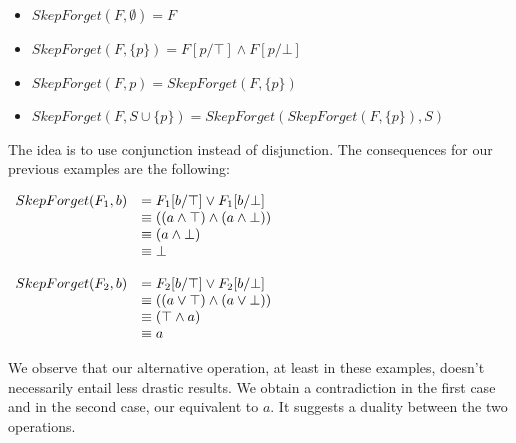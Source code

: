  \begin{itemize}
 \item $\mathit{SkepForget(F,\emptyset)} = F$
 \item $\mathit{SkepForget(F,\{p\})} = F[p/\top] \land F[p/\bot]$
 \item $\mathit{SkepForget}(F,p) = \mathit{SkepForget}(F,\{p\})$
 \item $\mathit{SkepForget(F,S \cup \{p\})} = \mathit{SkepForget(SkepForget(F,\{p\}), S)}$
 \end{itemize}
The idea is to use conjunction instead of disjunction. The consequences for our previous examples are the following:
\begin{center}$\begin{array}{l l}
SkepForget(F_1,b)&=F_1[b/\top] \lor F_1[b/\bot]\\ &\equiv ((a \land \top) \land (a \land \bot)) \\
 &\equiv (a \land \bot) \\
 &\equiv \bot \\
\end{array}$\end{center}\begin{center}$\begin{array}{l l}
SkepForget(F_2,b)&=F_2[b/\top] \lor F_2[b/\bot]\\ &\equiv ((a \lor \top) \land (a \lor \bot)) \\
 &\equiv (\top \land a) \\
 &\equiv a \\
\end{array}$\end{center}
We observe that our alternative operation, at least in these examples, doesn't necessarily entail less drastic results. 
We obtain a contradiction in the first case and in the second case, our equivalent to $a$. 
It suggests a duality between the two operations.